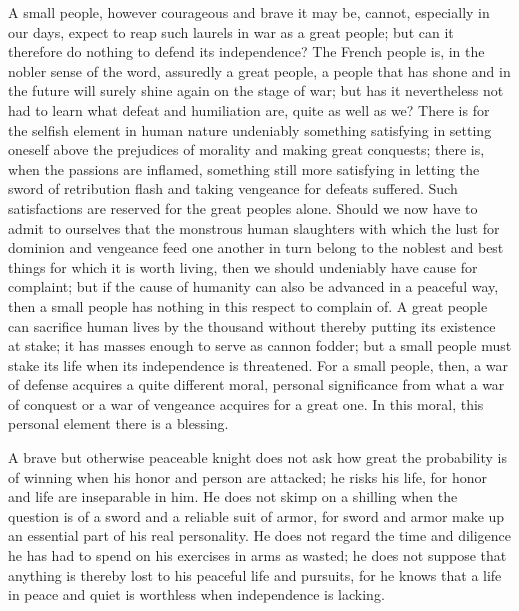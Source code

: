 \documentclass[12pt,a4paper,openany]{book}
\newcommand{\opage}[1]{\marginnote{\footnotesize\textit{[#1]}}}
\begin{document}
A small people, however courageous and brave it may be,
cannot, especially in our days, expect to reap such
laurels in war as a great people; but can it
therefore do nothing to defend its independence?
The French people is, in the nobler sense of the word, assuredly
a great people, a people that has shone and in the future
will surely shine again on the stage of war; but
has it nevertheless not had to learn what defeat
and humiliation are, quite as well as we? There is for
the selfish element in human nature undeniably something satisfying
in setting oneself above the prejudices of morality
and making great conquests; there is, when the passions
are inflamed, something still more satisfying in
letting the sword of retribution flash and taking vengeance for
defeats suffered. Such satisfactions are reserved
for the great peoples alone. Should we now have to admit to ourselves
that the monstrous human slaughters with which the lust for dominion
and vengeance feed one another in turn belong to
the noblest and best things for which it is worth living,
\setcounter{footnote}{0}%
\opage{141}then we should undeniably have cause for complaint; but if
the cause of humanity can also be advanced in a peaceful
way, then a small people has nothing in this respect
to complain of. A great people can sacrifice human lives
by the thousand without thereby putting its existence
at stake; it has masses enough to serve
as cannon fodder; but a small people must stake its life when
its independence is threatened. For a small people, then,
a war of defense acquires a quite different moral, personal
significance from what a war of conquest or a war of vengeance
acquires for a great one. In this moral, this personal element
there is a blessing.

A brave but otherwise peaceable knight does not
ask how great the probability is of winning
when his honor and person are attacked; he risks his life,
for honor and life are inseparable in him. He does not skimp
on a shilling when the question is of a
sword and a reliable suit of armor, for sword and armor
make up an essential part of his real personality.
He does not regard the time and diligence he has
had to spend on his exercises in arms as wasted;
he does not suppose that anything is thereby lost to his
peaceful life and pursuits, for he knows that a life in peace
and quiet is worthless when independence is lacking.
\end{document}
